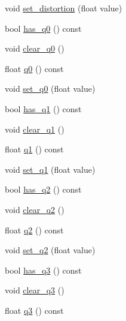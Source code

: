 \begin{DoxyCompactItemize}
\item 
void \hyperlink{class_s_s_l___geometry_camera_calibration_a18431c56c671ae1dca14b252139dc8e4}{set\-\_\-distortion} (float value)
\item 
bool \hyperlink{class_s_s_l___geometry_camera_calibration_a20d503ba30eb1f1b898afa69743f77ef}{has\-\_\-q0} () const 
\item 
void \hyperlink{class_s_s_l___geometry_camera_calibration_a523fcc4e6fcf61b59bd6b86c963c5e0f}{clear\-\_\-q0} ()
\item 
float \hyperlink{class_s_s_l___geometry_camera_calibration_a20d0fa157fcf3592aa4f05ef3e3c777c}{q0} () const 
\item 
void \hyperlink{class_s_s_l___geometry_camera_calibration_a04e36701f94a230db64138e23c37474e}{set\-\_\-q0} (float value)
\item 
bool \hyperlink{class_s_s_l___geometry_camera_calibration_ab3734353b05707381483b83ebda64b99}{has\-\_\-q1} () const 
\item 
void \hyperlink{class_s_s_l___geometry_camera_calibration_a3666b7c03f6d784178dc1e068fd05961}{clear\-\_\-q1} ()
\item 
float \hyperlink{class_s_s_l___geometry_camera_calibration_a01c6c9560a12a2d11e2c24cad143c0a5}{q1} () const 
\item 
void \hyperlink{class_s_s_l___geometry_camera_calibration_aca5481669bd787bdb5b515d96abc2da8}{set\-\_\-q1} (float value)
\item 
bool \hyperlink{class_s_s_l___geometry_camera_calibration_aa917c4e1228a15a683bf758f41291fa1}{has\-\_\-q2} () const 
\item 
void \hyperlink{class_s_s_l___geometry_camera_calibration_a6dbffb3999646aa9c7436a58ed8ff09e}{clear\-\_\-q2} ()
\item 
float \hyperlink{class_s_s_l___geometry_camera_calibration_a1069bc816ff1dd5d4a3b45a05e8f78a9}{q2} () const 
\item 
void \hyperlink{class_s_s_l___geometry_camera_calibration_aa102a0e1e0f728d43915a22b095f0387}{set\-\_\-q2} (float value)
\item 
bool \hyperlink{class_s_s_l___geometry_camera_calibration_a92933d2d38d9a6bd1df39ba22dc4a246}{has\-\_\-q3} () const 
\item 
void \hyperlink{class_s_s_l___geometry_camera_calibration_a03c8921a31f1e451c4fbdecac77c5da8}{clear\-\_\-q3} ()
\item 
float \hyperlink{class_s_s_l___geometry_camera_calibration_ab00aad751be9d0285cc731d502a49433}{q3} () const 
\item 

\end{DoxyCompactItemize}
